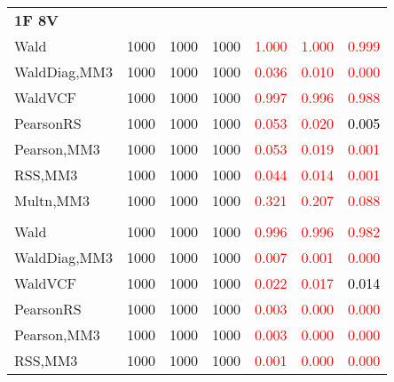\documentclass[
]{article}
\begin{document}
\begin{table}[H]
{\begin{tabular}[t]{lrrrrrr}
\multicolumn{7}{l}{\textbf{1F 8V}}\\
\hspace{1em}Wald & 1000 & 1000 & 1000 & \textcolor{red}{1.000} & \textcolor{red}{1.000} & \textcolor{red}{0.999}\\
\hspace{1em}WaldDiag,MM3 & 1000 & 1000 & 1000 & \textcolor{red}{0.036} & \textcolor{red}{0.010} & \textcolor{red}{0.000}\\
\hspace{1em}WaldVCF & 1000 & 1000 & 1000 & \textcolor{red}{0.997} & \textcolor{red}{0.996} & \textcolor{red}{0.988}\\
\hspace{1em}PearsonRS & 1000 & 1000 & 1000 & \textcolor{red}{0.053} & \textcolor{red}{0.020} & \textcolor{black}{0.005}\\
\hspace{1em}Pearson,MM3 & 1000 & 1000 & 1000 & \textcolor{red}{0.053} & \textcolor{red}{0.019} & \textcolor{red}{0.001}\\
\hspace{1em}RSS,MM3 & 1000 & 1000 & 1000 & \textcolor{red}{0.044} & \textcolor{red}{0.014} & \textcolor{red}{0.001}\\
\hspace{1em}Multn,MM3 & 1000 & 1000 & 1000 & \textcolor{red}{0.321} & \textcolor{red}{0.207} & \textcolor{red}{0.088}\\
\addlinespace[0.3em]
\multicolumn{7}{l}{\textbf{1F 15V}}\\
\hspace{1em}Wald & 1000 & 1000 & 1000 & \textcolor{red}{0.996} & \textcolor{red}{0.996} & \textcolor{red}{0.982}\\
\hspace{1em}WaldDiag,MM3 & 1000 & 1000 & 1000 & \textcolor{red}{0.007} & \textcolor{red}{0.001} & \textcolor{red}{0.000}\\
\hspace{1em}WaldVCF & 1000 & 1000 & 1000 & \textcolor{red}{0.022} & \textcolor{red}{0.017} & \textcolor{black}{0.014}\\
\hspace{1em}PearsonRS & 1000 & 1000 & 1000 & \textcolor{red}{0.003} & \textcolor{red}{0.000} & \textcolor{red}{0.000}\\
\hspace{1em}Pearson,MM3 & 1000 & 1000 & 1000 & \textcolor{red}{0.003} & \textcolor{red}{0.000} & \textcolor{red}{0.000}\\
\hspace{1em}RSS,MM3 & 1000 & 1000 & 1000 & \textcolor{red}{0.001} & \textcolor{red}{0.000} & \textcolor{red}{0.000}\\

\end{tabular}}
\end{table}
\end{document}
